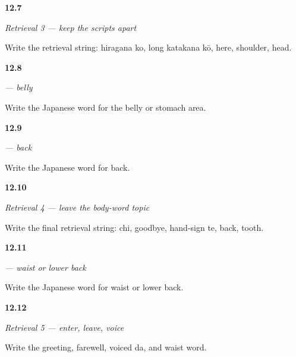 \noindent\begin{minipage}[t]{\linewidth}
\raggedright
\hypertarget{review-JA-R12-mixed-scripts-card}{\textbf{12.7}} \emph{Retrieval 3 — keep the scripts apart}\par
\small Write the retrieval string: hiragana ko, long katakana kō, here, shoulder, head.
\end{minipage}\par\medskip

\noindent\begin{minipage}[t]{\linewidth}
\raggedright
\hypertarget{review-JA-C12-onaka-write}{\textbf{12.8}} \emph{ — belly}\par
\small Write the Japanese word for the belly or stomach area.
\end{minipage}\par\medskip

\noindent\begin{minipage}[t]{\linewidth}
\raggedright
\hypertarget{review-JA-C12-senaka-write}{\textbf{12.9}} \emph{ — back}\par
\small Write the Japanese word for back.
\end{minipage}\par\medskip

\noindent\begin{minipage}[t]{\linewidth}
\raggedright
\hypertarget{review-JA-R12-doorway-card}{\textbf{12.10}} \emph{Retrieval 4 — leave the body-word topic}\par
\small Write the final retrieval string: chi, goodbye, hand-sign te, back, tooth.
\end{minipage}\par\medskip

\noindent\begin{minipage}[t]{\linewidth}
\raggedright
\hypertarget{review-JA-C12-koshi-write}{\textbf{12.11}} \emph{ — waist or lower back}\par
\small Write the Japanese word for waist or lower back.
\end{minipage}\par\medskip

\noindent\begin{minipage}[t]{\linewidth}
\raggedright
\hypertarget{review-JA-R12-farewell-card}{\textbf{12.12}} \emph{Retrieval 5 — enter, leave, voice}\par
\small Write the greeting, farewell, voiced da, and waist word.
\end{minipage}\par\medskip


